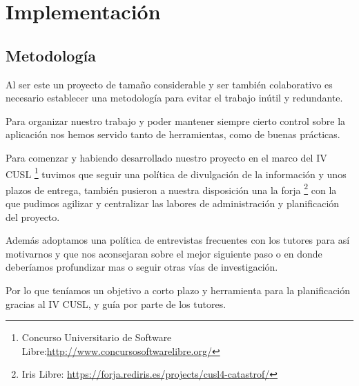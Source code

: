 
\chapter*{Implementación} \label{cap5}


\begin{flushright}
\begin{minipage}{7.85cm}
    {\em Si necesitas mas de tres niveles de indentación para tu código, estas
jodido, y deberías arreglar tu programa}} \\  Linus Torvalds
\end{minipage}
\end{flushright}

\vspace*{5mm}

\section*{Metodología}
Al ser este un proyecto de tamaño considerable y ser también colaborativo es
necesario establecer una metodología para evitar el trabajo inútil y redundante.

Para organizar nuestro trabajo y poder mantener siempre cierto control sobre la
aplicación nos hemos servido tanto de herramientas, como de buenas prácticas.

Para comenzar y habiendo desarrollado nuestro proyecto en el marco del IV CUSL
\footnote{Concurso Universitario de
Software Libre:\url{http://www.concursosoftwarelibre.org/}} tuvimos que seguir
una política de divulgación de la información y unos plazos de entrega, también
pusieron a nuestra disposición una la forja
\footnote{Iris Libre: \url{https://forja.rediris.es/projects/cusl4-catastrof/}}
con la que pudimos agilizar y centralizar las labores de administración y
planificación del proyecto.

Además adoptamos una política de entrevistas frecuentes con los tutores para
así motivarnos y que nos aconsejaran sobre el mejor siguiente paso o en donde
deberíamos profundizar mas o seguir otras vías de investigación.

Por lo que teníamos un objetivo a corto plazo y herramienta para la
planificación gracias al  IV CUSL, y guía por parte de los tutores.

